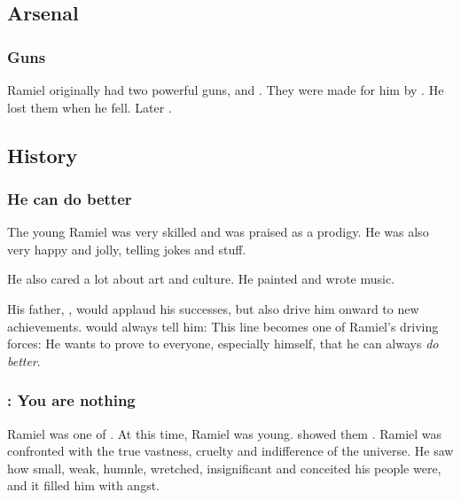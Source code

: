 \subsection{Arsenal}





\subsubsection{Guns}
\index{\Currah}
\index{\Strith}
Ramiel originally had two powerful guns, \Strith{} and \Currah. 
They were made for him by \Lyorith. 
He lost them when he fell. 
Later . 









\subsection{History}
\subsubsection{He can do better}
The young Ramiel was very skilled and was praised as a prodigy. 
He was also very happy and jolly, telling jokes and stuff. 

He also cared a lot about art and culture. 
He painted and wrote music. 

His father, \Nathrach{}, would applaud his successes, but also drive him onward to new achievements. 
\Nathrach{} would always tell him: 
This line becomes one of Ramiel's driving forces: 
He wants to prove to everyone, especially himself, that he can always \emph{do better}. 





\subsubsection{\Semiza{}: You are nothing}
Ramiel was one of . 
At this time, Ramiel was young. 
\Semiza{} showed them . 
Ramiel was confronted with the true vastness, cruelty and indifference of the universe. 
He saw how small, weak, humnle, wretched, insignificant and conceited his people were, and it filled him with angst. 

